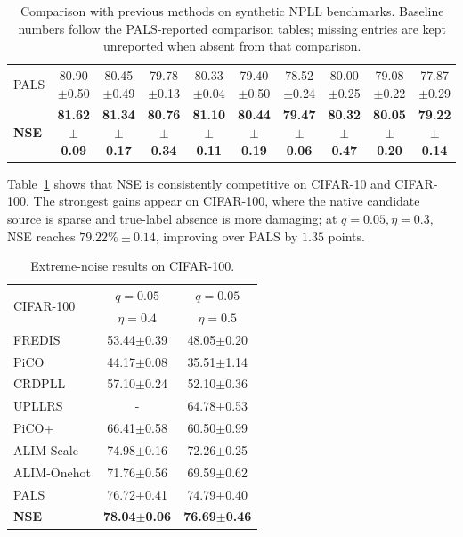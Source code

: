 \begin{table}[t]
\begin{tabular}{l|ccc|ccc|ccc}
PALS & {80.90$\pm$0.50} & {80.45$\pm$0.49} & {79.78$\pm$0.13} & {80.33$\pm$0.04} & { 79.40$\pm$0.50} & { 78.52$\pm$0.24} & {80.00$\pm$0.25} & { 79.08$\pm$0.22} & {77.87$\pm$0.29} \\
\rowcolor{gray!15} \textbf{NSE} & \textbf{81.62$\pm$0.09} & \textbf{81.34$\pm$0.17} & \textbf{80.76$\pm$0.34} & \textbf{81.10$\pm$0.11} & \textbf{80.44$\pm$0.19} & \textbf{79.47$\pm$0.06} & \textbf{80.32$\pm$0.47} & \textbf{80.05$\pm$0.20} & \textbf{79.22$\pm$0.14}  \\
\bottomrule
\end{tabular}
\caption{Comparison with previous methods on synthetic NPLL benchmarks. Baseline numbers follow the PALS-reported comparison tables; missing entries are kept unreported when absent from that comparison.}
\label{tab:cifar}
\end{table}

Table~\ref{tab:cifar} shows that NSE is consistently competitive on CIFAR-10
and CIFAR-100. The strongest gains appear on CIFAR-100, where the native
candidate source is sparse and true-label absence is more damaging; at
$q=0.05,\eta=0.3$, NSE reaches $79.22\%\pm0.14$, improving over PALS by
$1.35$ points.

\begin{table}[t]
\centering
\fontsize{8pt}{8pt}\selectfont
\begin{tabular}{l|c|c}
\hline
\multirow{2}{*}{CIFAR-100} &$q=0.05$ &$q=0.05$ \\
&$ \eta=0.4$ &$ \eta=0.5$ \\
\hline
FREDIS & 53.44$\pm$0.39 & 48.05$\pm$0.20 \\
PiCO& 44.17$\pm$0.08&35.51$\pm$1.14\\
CRDPLL& 57.10$\pm$0.24&52.10$\pm$0.36\\
UPLLRS & -& 64.78$\pm$0.53 \\
PiCO+ & 66.41$\pm$0.58 & 60.50$\pm$0.99 \\
ALIM-Scale & 74.98$\pm$0.16 & 72.26$\pm$0.25 \\
ALIM-Onehot & 71.76$\pm$0.56 & 69.59$\pm$0.62 \\
PALS & {76.72$\pm$0.41} & { 74.79$\pm$0.40} \\
\hline
\rowcolor{gray!15} \textbf{NSE} & \textbf{78.04$\pm$0.06} & \textbf{76.69$\pm$0.46} \\
\hline
\end{tabular}
\caption{Extreme-noise results on CIFAR-100.}
\label{tab:extreme_noise}
\end{table}


